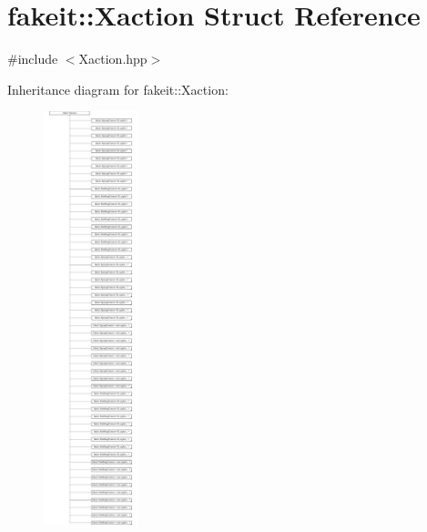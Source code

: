 \hypertarget{structfakeit_1_1Xaction}{}\section{fakeit\+::Xaction Struct Reference}
\label{structfakeit_1_1Xaction}


{\ttfamily \#include $<$Xaction.\+hpp$>$}

Inheritance diagram for fakeit\+::Xaction\+:\begin{figure}[H]
\begin{center}
\leavevmode
\includegraphics[height=12.000000cm]{structfakeit_1_1Xaction}
\end{center}
\end{figure}
